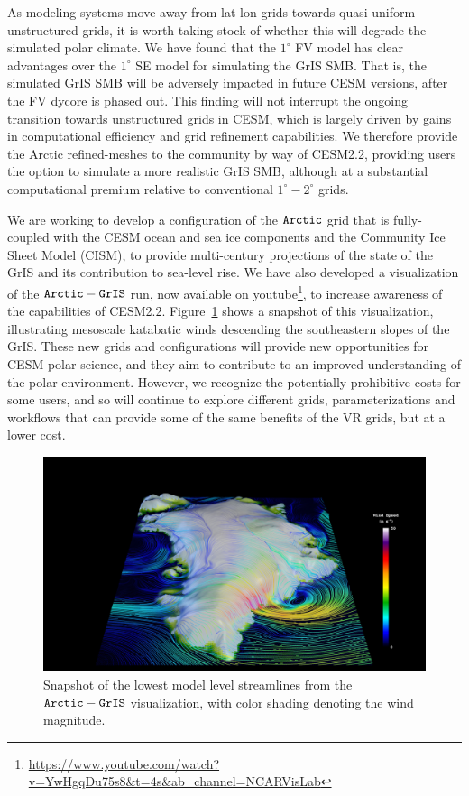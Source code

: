 \documentclass[draft]{agujournal2019}
\begin{document}
As modeling systems move away from lat-lon grids towards quasi-uniform unstructured grids, it is worth taking stock of whether this will degrade the simulated polar climate. We have found that the $1^{\circ}$ FV model has clear advantages over the $1^{\circ}$ SE model for simulating the GrIS SMB. That is, the simulated GrIS SMB will be adversely impacted in future CESM versions, after the FV dycore is phased out. This finding will not interrupt the ongoing transition towards unstructured grids in CESM, which is largely driven by gains in computational efficiency and grid refinement capabilities. We therefore provide the Arctic refined-meshes to the community by way of CESM2.2, providing users the option to simulate a more realistic GrIS SMB, although at a substantial computational premium relative to conventional $1^{\circ}-2^{\circ}$ grids.

We are  working to develop a configuration of the $\tt Arctic$ grid that is fully-coupled with the CESM ocean and sea ice components and the Community Ice Sheet Model (CISM), to provide multi-century projections of the state of the GrIS and its contribution to sea-level rise. We have also developed a visualization of the $\tt Arctic-GrIS$ run, now available on youtube\footnote{\url{https://www.youtube.com/watch?v=YwHgqDu75s8&t=4s&ab_channel=NCARVisLab}}, to increase awareness of the capabilities of CESM2.2. Figure~\ref{fig:viz} shows a snapshot of this visualization, illustrating mesoscale katabatic winds descending the southeastern slopes of the GrIS. These new grids and configurations will provide new opportunities for CESM polar science, and they aim to contribute to an improved understanding of the polar environment. However, we recognize the potentially prohibitive costs for some users, and so will continue to explore different grids, parameterizations and workflows that can provide some of the same benefits of the VR grids, but at a lower cost.

\begin{figure}[t]
\begin{center}
         \includegraphics[width=130mm]{figs/Vis1472.jpg}
\end{center}
\caption{Snapshot of the lowest model level streamlines from the $\tt Arctic-GrIS$ visualization, with color shading denoting the wind magnitude.}
\label{fig:viz}
\end{figure}
\end{document}
